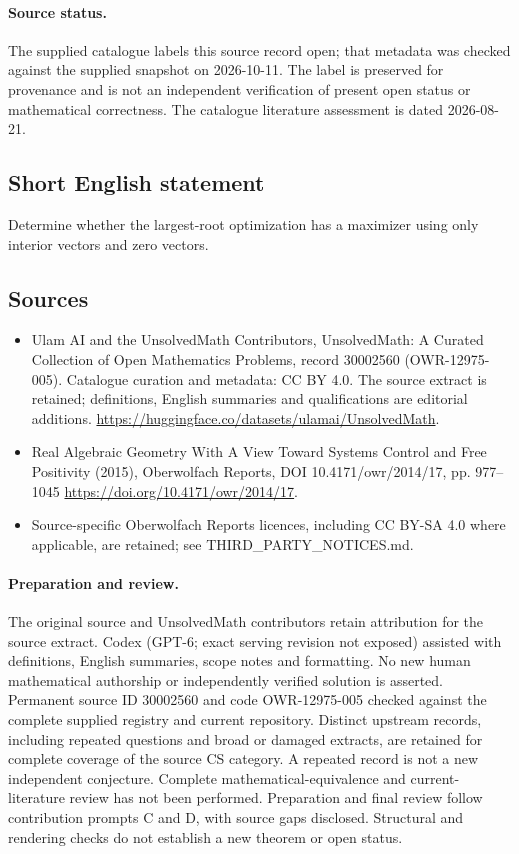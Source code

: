 \documentclass[11pt]{article}
\begin{document}
\paragraph{Source status.}
The supplied catalogue labels this source record open; that metadata was checked against the supplied snapshot on 2026-10-11. The label is preserved for provenance and is not an independent verification of present open status or mathematical correctness. The catalogue literature assessment is dated 2026-08-21.
\subsection{Short English statement}
Determine whether the largest-root optimization has a maximizer using only interior vectors and zero vectors.
\subsection{Sources}
\begin{itemize}
\item[\hypertarget{source:30002560:1}{S1}] Ulam AI and the UnsolvedMath Contributors, UnsolvedMath: A Curated Collection of Open Mathematics Problems, record 30002560 (OWR-12975-005). Catalogue curation and metadata: CC BY 4.0. The source extract is retained; definitions, English summaries and qualifications are editorial additions.
\url{https://huggingface.co/datasets/ulamai/UnsolvedMath}.
\item[\hypertarget{source:30002560:2}{S2}] Real Algebraic Geometry With A View Toward Systems Control and Free Positivity (2015), Oberwolfach Reports, DOI 10.4171/owr/2014/17, pp. 977--1045
\url{https://doi.org/10.4171/owr/2014/17}.
\item Source-specific Oberwolfach Reports licences, including CC BY-SA 4.0 where applicable, are retained; see THIRD\_PARTY\_NOTICES.md.
\end{itemize}
\paragraph{Preparation and review.}
The original source and UnsolvedMath contributors retain attribution for the source extract. Codex (GPT-6; exact serving revision not exposed) assisted with definitions, English summaries, scope notes and formatting. No new human mathematical authorship or independently verified solution is asserted. Permanent source ID 30002560 and code OWR-12975-005 checked against the complete supplied registry and current repository. Distinct upstream records, including repeated questions and broad or damaged extracts, are retained for complete coverage of the source CS category. A repeated record is not a new independent conjecture. Complete mathematical-equivalence and current-literature review has not been performed. Preparation and final review follow contribution prompts C and D, with source gaps disclosed. Structural and rendering checks do not establish a new theorem or open status.
\label{end:30002560}
\end{document}
